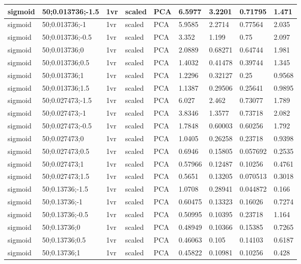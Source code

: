 \begin{longtable}{lllllllll}
sigmoid & 50;0.013736;-1.5 & 1vr & scaled & PCA & 6.5977 & 3.2201 & 0.71795 & 1.471\\ \hline
sigmoid & 50;0.013736;-1 & 1vr & scaled & PCA & 5.9585 & 2.2714 & 0.77564 & 2.035\\ \hline
sigmoid & 50;0.013736;-0.5 & 1vr & scaled & PCA & 3.352 & 1.199 & 0.75 & 2.097\\ \hline
sigmoid & 50;0.013736;0 & 1vr & scaled & PCA & 2.0889 & 0.68271 & 0.64744 & 1.981\\ \hline
sigmoid & 50;0.013736;0.5 & 1vr & scaled & PCA & 1.4032 & 0.41478 & 0.39744 & 1.345\\ \hline
sigmoid & 50;0.013736;1 & 1vr & scaled & PCA & 1.2296 & 0.32127 & 0.25 & 0.9568\\ \hline
sigmoid & 50;0.013736;1.5 & 1vr & scaled & PCA & 1.1387 & 0.29506 & 0.25641 & 0.9895\\ \hline
sigmoid & 50;0.027473;-1.5 & 1vr & scaled & PCA & 6.027 & 2.462 & 0.73077 & 1.789\\ \hline
sigmoid & 50;0.027473;-1 & 1vr & scaled & PCA & 3.8346 & 1.3577 & 0.73718 & 2.082\\ \hline
sigmoid & 50;0.027473;-0.5 & 1vr & scaled & PCA & 1.7848 & 0.60003 & 0.60256 & 1.792\\ \hline
sigmoid & 50;0.027473;0 & 1vr & scaled & PCA & 1.0405 & 0.26258 & 0.23718 & 0.9398\\ \hline
sigmoid & 50;0.027473;0.5 & 1vr & scaled & PCA & 0.6946 & 0.15805 & 0.057692 & 0.2535\\ \hline
sigmoid & 50;0.027473;1 & 1vr & scaled & PCA & 0.57966 & 0.12487 & 0.10256 & 0.4761\\ \hline
sigmoid & 50;0.027473;1.5 & 1vr & scaled & PCA & 0.5651 & 0.13205 & 0.070513 & 0.3018\\ \hline
sigmoid & 50;0.13736;-1.5 & 1vr & scaled & PCA & 1.0708 & 0.28941 & 0.044872 & 0.166\\ \hline
sigmoid & 50;0.13736;-1 & 1vr & scaled & PCA & 0.60475 & 0.13323 & 0.16026 & 0.7274\\ \hline
sigmoid & 50;0.13736;-0.5 & 1vr & scaled & PCA & 0.50995 & 0.10395 & 0.23718 & 1.164\\ \hline
sigmoid & 50;0.13736;0 & 1vr & scaled & PCA & 0.48949 & 0.10366 & 0.15385 & 0.7265\\ \hline
sigmoid & 50;0.13736;0.5 & 1vr & scaled & PCA & 0.46063 & 0.105 & 0.14103 & 0.6187\\ \hline
sigmoid & 50;0.13736;1 & 1vr & scaled & PCA & 0.45822 & 0.10981 & 0.10256 & 0.428\\ \hline

\end{longtable}

